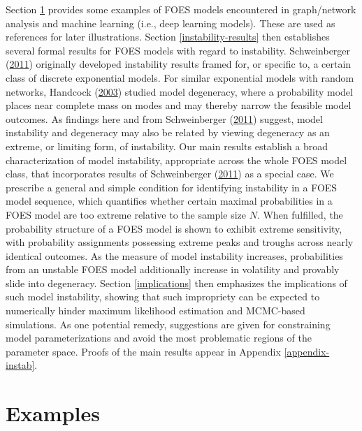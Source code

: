 \documentclass[12pt]{article}
\theoremstyle{definition}
\begin{document}
Section \ref{examples}   provides some examples of FOES models encountered in graph/network analysis and machine learning (i.e., deep learning models). These are used as references for later illustrations.  Section \ref{instability-results} then  establishes several formal results for  FOES models with regard to instability.  Schweinberger
(\protect\hyperlink{ref-schweinberger2011instability}{2011}) originally developed instability results framed for, or specific to, a certain class of discrete exponential  models.  For similar exponential models with random networks,
Handcock (\protect\hyperlink{ref-handcock2003assessing}{2003})   studied model degeneracy, where a probability model places near complete mass on  modes and may thereby narrow the feasible
  model outcomes.    As findings here and from  Schweinberger
(\protect\hyperlink{ref-schweinberger2011instability}{2011}) suggest, model instability and degeneracy may also be related by viewing degeneracy as an extreme, or limiting form, of instability.
Our main results establish a broad characterization of model instability, appropriate across the whole FOES model class,
 that incorporates results of
 Schweinberger
(\protect\hyperlink{ref-schweinberger2011instability}{2011}) as a special case.
 We prescribe a general and simple condition  for identifying instability in a FOES model sequence,   which  quantifies whether certain maximal probabilities in a FOES model  are too extreme relative to the sample size $N$.
When fulfilled, the probability structure of a FOES model is shown to exhibit extreme sensitivity, with probability assignments possessing extreme  peaks and troughs across nearly identical outcomes.  As the measure of model instability increases,
probabilities from an unstable FOES model  additionally increase in volatility and provably slide into  degeneracy.
Section \ref{implications} then emphasizes the implications of such model instability, showing that such impropriety
can be expected to numerically hinder maximum likelihood estimation and   MCMC-based simulations.  As one potential remedy, suggestions are given
 for constraining model parameterizations and avoid the most problematic regions of the parameter space. Proofs of the main results appear in Appendix \ref{appendix-instab}.




\section{Examples}\label{examples}
\end{document}
